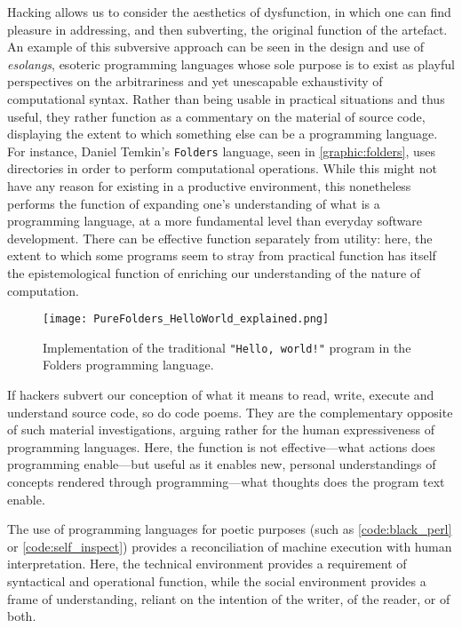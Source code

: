 Hacking allows us to consider the aesthetics of dysfunction, in which one can find pleasure in addressing, and then subverting, the original function of the artefact. An example of this subversive approach can be seen in the design and use of \emph{esolangs}, esoteric programming languages whose sole purpose is to exist as playful perspectives on the arbitrariness and yet unescapable exhaustivity of computational syntax. Rather than being usable in practical situations and thus useful, they rather function as a commentary on the material of source code, displaying the extent to which something else can be a programming language. For instance, Daniel Temkin's \lstinline{Folders} language, seen in \autoref{graphic:folders}, uses directories in order to perform computational operations. While this might not have any reason for existing in a productive environment, this nonetheless performs the function of expanding one's understanding of what is a programming language, at a more fundamental level than everyday software development. There can be effective function separately from utility: here, the extent to which some programs seem to stray from practical function has itself the epistemological function of enriching our understanding of the nature of computation.

\begin{figure}
  \texttt{[image: PureFolders\_HelloWorld\_explained.png]}
  \caption{Implementation of the traditional \lstinline{"Hello, world!"} program in the Folders programming language. \citep{temkin_daniel_2015}}
  \label{graphic:folders}
\end{figure}

If hackers subvert our conception of what it means to read, write, execute and understand source code, so do code poems. They are the complementary opposite of such material investigations, arguing rather for the human expressiveness of programming languages. Here, the function is not effective—what actions does programming enable—but useful as it enables new, personal understandings of concepts rendered through programming—what thoughts does the program text enable.

The use of programming languages for poetic purposes (such as \autoref{code:black_perl} or \autoref{code:self_inspect}) provides a reconciliation of machine execution with human interpretation. Here, the technical environment provides a requirement of syntactical and operational function, while the social environment provides a frame of understanding, reliant on the intention of the writer, of the reader, or of both.

